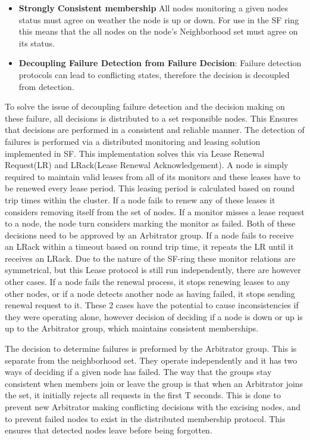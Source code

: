 \documentclass[a4paper,10pt,titlepage]{report}
\begin{document}
    \begin{itemize}
        \item \textbf{Strongly Consistent membership} All nodes monitoring a given nodes status must agree on weather the node is up or down. For use in the SF ring this means that the all nodes on the node's Neighborhood set must agree on its status.
        \item \textbf{Decoupling Failure Detection from Failure Decision}: Failure detection protocols can lead to conflicting states, therefore the decision is decoupled from detection.
    \end{itemize}
    \vspace{5mm}

    To solve the issue of decoupling failure detection and the decision making on these failure, all decisions is distributed to a set responsible nodes. This Ensures that decisions are performed in a consistent and reliable manner. The detection of failures is performed via a distributed monitoring and leasing solution implemented in SF. This implementation solves this via Lease Renewal Request(LR) and LRack(Lease Renewal Acknowledgement). A node is simply required to maintain valid leases from all of its monitors and these leases have to be renewed every lease period. This leasing period is calculated based on round trip times within the cluster. If a node fails to renew any of these leases it considers removing itself from the set of nodes. If a monitor misses a lease request to a node, the node turn considers marking the monitor as failed. Both of these decisions need to be approved by an Arbitrator group. If a node fails to receive an LRack within a timeout based on round trip time, it repeats the LR until it receives an LRack. Due to the nature of the SF-ring these monitor relations are symmetrical, but this Lease protocol is still run independently, there are however other cases. If a node fails the renewal process, it stops renewing leases to any other nodes, or if a node detects another node as having failed, it stops sending renewal request to it. These 2 cases have the potential to cause inconsistencies if they were operating alone, however decision of deciding if a node is down or up is up to the Arbitrator group, which maintains consistent memberships. \\
    \vspace{5mm}

    The decision to determine failures is preformed by the Arbitrator group. This is separate from the neighborhood set. They operate independently and it has two ways of deciding if a given node has failed. The way that the groups stay consistent when members join or leave the group is that when an Arbitrator joins the set, it initially rejects all requests in the first T seconds. This is done to prevent new Arbitrator making conflicting decisions with the excising nodes, and to prevent failed nodes to exist in the distributed membership protocol. This ensures that detected nodes leave before being forgotten.\\
    \vspace{5mm}
\end{document}
